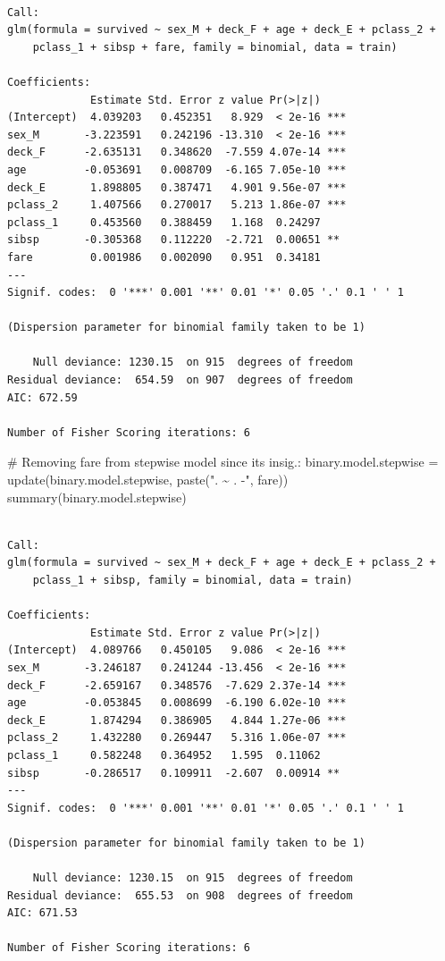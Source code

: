 \documentclass[
  letterpaper,
  DIV=11,
  numbers=noendperiod]{scrartcl}
\newenvironment{Shaded}{\begin{snugshade}}{\end{snugshade}}
\newcommand{\CommentTok}[1]{\textcolor[rgb]{0.37,0.37,0.37}{#1}}
\newcommand{\FunctionTok}[1]{\textcolor[rgb]{0.28,0.35,0.67}{#1}}
\newcommand{\NormalTok}[1]{\textcolor[rgb]{0.00,0.23,0.31}{#1}}
\newcommand{\OtherTok}[1]{\textcolor[rgb]{0.00,0.23,0.31}{#1}}
\newcommand{\StringTok}[1]{\textcolor[rgb]{0.13,0.47,0.30}{#1}}
\begin{document}
\begin{verbatim}

Call:
glm(formula = survived ~ sex_M + deck_F + age + deck_E + pclass_2 + 
    pclass_1 + sibsp + fare, family = binomial, data = train)

Coefficients:
             Estimate Std. Error z value Pr(>|z|)    
(Intercept)  4.039203   0.452351   8.929  < 2e-16 ***
sex_M       -3.223591   0.242196 -13.310  < 2e-16 ***
deck_F      -2.635131   0.348620  -7.559 4.07e-14 ***
age         -0.053691   0.008709  -6.165 7.05e-10 ***
deck_E       1.898805   0.387471   4.901 9.56e-07 ***
pclass_2     1.407566   0.270017   5.213 1.86e-07 ***
pclass_1     0.453560   0.388459   1.168  0.24297    
sibsp       -0.305368   0.112220  -2.721  0.00651 ** 
fare         0.001986   0.002090   0.951  0.34181    
---
Signif. codes:  0 '***' 0.001 '**' 0.01 '*' 0.05 '.' 0.1 ' ' 1

(Dispersion parameter for binomial family taken to be 1)

    Null deviance: 1230.15  on 915  degrees of freedom
Residual deviance:  654.59  on 907  degrees of freedom
AIC: 672.59

Number of Fisher Scoring iterations: 6
\end{verbatim}

\begin{Shaded}
\begin{Highlighting}[]
\CommentTok{\# Removing fare from stepwise model since its insig.:}
\NormalTok{binary.model.stepwise }\OtherTok{=} \FunctionTok{update}\NormalTok{(binary.model.stepwise, }\FunctionTok{paste}\NormalTok{(}\StringTok{". \textasciitilde{} . {-}"}\NormalTok{, }\StringTok{\textquotesingle{}fare\textquotesingle{}}\NormalTok{))}
\FunctionTok{summary}\NormalTok{(binary.model.stepwise)}
\end{Highlighting}
\end{Shaded}

\begin{verbatim}

Call:
glm(formula = survived ~ sex_M + deck_F + age + deck_E + pclass_2 + 
    pclass_1 + sibsp, family = binomial, data = train)

Coefficients:
             Estimate Std. Error z value Pr(>|z|)    
(Intercept)  4.089766   0.450105   9.086  < 2e-16 ***
sex_M       -3.246187   0.241244 -13.456  < 2e-16 ***
deck_F      -2.659167   0.348576  -7.629 2.37e-14 ***
age         -0.053845   0.008699  -6.190 6.02e-10 ***
deck_E       1.874294   0.386905   4.844 1.27e-06 ***
pclass_2     1.432280   0.269447   5.316 1.06e-07 ***
pclass_1     0.582248   0.364952   1.595  0.11062    
sibsp       -0.286517   0.109911  -2.607  0.00914 ** 
---
Signif. codes:  0 '***' 0.001 '**' 0.01 '*' 0.05 '.' 0.1 ' ' 1

(Dispersion parameter for binomial family taken to be 1)

    Null deviance: 1230.15  on 915  degrees of freedom
Residual deviance:  655.53  on 908  degrees of freedom
AIC: 671.53

Number of Fisher Scoring iterations: 6
\end{verbatim}
\end{document}
